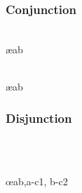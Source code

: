 \vspace{-5pt}

\begin{multicols}{2}
\subsubsection*{Conjunction}

\begin{pf}
	 
\end{pf}

\vfill\null
\columnbreak

\begin{pf}
\\	 \ae{ab}

\\	 \ae{ab}
\end{pf}
\end{multicols} %

\vspace{-10pt}
\hrulefill
\vspace{-10pt}
\begin{multicols}{2}
\subsubsection*{Disjunction}

\begin{pf}

\\	
\end{pf}

\vfill\null
\columnbreak

\begin{pf}
\\	\open
		\ellipsesline
	\close
	\open
		\ellipsesline
	\close
	 \oe{ab,a-c1, b-c2}
\end{pf}
%

\end{multicols} %


